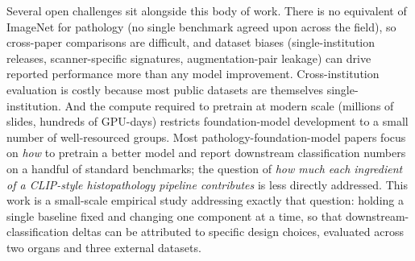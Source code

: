 Several open challenges sit alongside this body of work. There is no equivalent of ImageNet for pathology (no single benchmark agreed upon across the field), so cross-paper comparisons are difficult, and dataset biases (single-institution releases, scanner-specific signatures, augmentation-pair leakage) can drive reported performance more than any model improvement. Cross-institution evaluation is costly because most public datasets are themselves single-institution. And the compute required to pretrain at modern scale (millions of slides, hundreds of GPU-days) restricts foundation-model development to a small number of well-resourced groups. Most pathology-foundation-model papers focus on \emph{how} to pretrain a better model and report downstream classification numbers on a handful of standard benchmarks; the question of \emph{how much each ingredient of a CLIP-style histopathology pipeline contributes} is less directly addressed. This work is a small-scale empirical study addressing exactly that question: holding a single baseline fixed and changing one component at a time, so that downstream-classification deltas can be attributed to specific design choices, evaluated across two organs and three external datasets.
